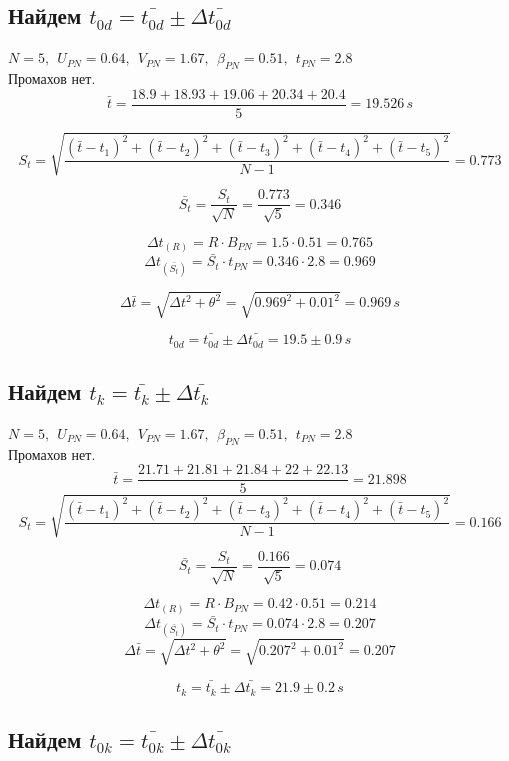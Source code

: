 \documentclass[a4paper,12pt]{report}
\begin{document}
\subsection*{Найдем $t_{0d} = \bar{t_{0d}} \pm \Delta \bar{t_{0d}}$}

$N=5,\ \ U_{PN}=0.64,\ \ V_{PN}=1.67,\ \ \beta_{PN}=0.51,\ \ t_{PN}=2.8$\\
Промахов нет.\\

\[\bar{t}= \frac{18.9+18.93+19.06+20.34+20.4}{5} = 19.526 \, s\]

\[S_{t}=\sqrt{\frac{(\bar{t}-{t}_1)^2+(\bar{t}-{t}_2)^2+(\bar{t}-{t}_3)^2+(\bar{t}-{t}_4)^2+(\bar{t}-{t}_5)^2}{N-1}} = 0.773\]

\[ \bar{S_{t}}=\frac{S_{t}}{\sqrt{N}}=\frac{0.773}{\sqrt{5}}=0.346 \]

\[ \Delta{t}_{(R)}=R\cdot B_{PN}=1.5\cdot 0.51=0.765 \]
\[ \Delta{t}_{(\bar{S_{t}})}=\bar{S_t}\cdot t_{PN}=0.346\cdot 2.8=0.969 \]

\[ \Delta{\bar{t}}=\sqrt{\Delta t^2 + \theta^2}=\sqrt{0.969^2 + 0.01^2}=0.969 \, s\]

\[ {t_{0d}}=\bar{t_{0d}}\pm \Delta{\bar{t_{0d}}}=19.5\pm 0.9 \, s\]


\subsection*{Найдем $t_{k} = \bar{t_{k}} \pm \Delta \bar{t_{k}}$}

$N=5,\ \ U_{PN}=0.64,\ \ V_{PN}=1.67,\ \ \beta_{PN}=0.51,\ \ t_{PN}=2.8$\\
Промахов нет.\\

\[\bar{t}= \frac{21.71+21.81+21.84+22+22.13}{5} =21.898 \]
\[S_{t}=\sqrt{\frac{(\bar{t}-{t}_1)^2+(\bar{t}-{t}_2)^2+(\bar{t}-{t}_3)^2+(\bar{t}-{t}_4)^2+(\bar{t}-{t}_5)^2}{N-1}} = 0.166\]

\[ \bar{S_{t}}=\frac{S_{t}}{\sqrt{N}}=\frac{0.166}{\sqrt{5}}=0.074 \]

\[ \Delta{t}_{(R)}=R\cdot B_{PN}=0.42\cdot 0.51=0.214 \]
\[ \Delta{t}_{(\bar{S_{t}})}=\bar{S_t}\cdot t_{PN}=0.074\cdot 2.8=0.207 \]
\[ \Delta{\bar{t}}=\sqrt{\Delta t^2 + \theta^2}=\sqrt{0.207^2 + 0.01^2}=0.207 \]

\[ {t_k}=\bar{t_k}\pm \Delta{\bar{t_k}}=21.9\pm 0.2 \, s\]

\subsection*{Найдем $t_{0k} = \bar{t_{0k}} \pm \Delta \bar{t_{0k}}$}
\end{document}

